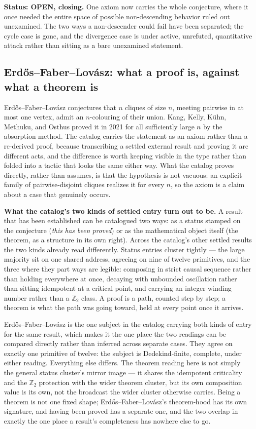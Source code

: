 \documentclass[12pt,a4paper]{article}
\makeatletter
\renewcommand{\_}{\ig@origunderscore\discretionary{}{}{}}
\makeatother
\begin{document}
\textbf{Status: OPEN, closing.} One axiom now carries the whole conjecture, where it
once needed the entire space of possible non-descending behavior ruled out unexamined.
The two ways a non-descender could fail have been separated; the cycle case is gone,
and the divergence case is under active, unrefuted, quantitative attack rather than
sitting as a bare unexamined statement.

\subsection{Erdős–Faber–Lovász: what a proof is, against what a theorem is}
\label{sec:efl}

Erdős–Faber–Lovász conjectures that $n$ cliques of size $n$, meeting pairwise in at
most one vertex, admit an $n$-colouring of their union. Kang, Kelly, Kühn, Methuku, and
Osthus proved it in 2021 for all sufficiently large $n$ by the absorption method. The
catalog carries the statement as an axiom rather than a re-derived proof, because
transcribing a settled external result and proving it are different acts, and the
difference is worth keeping visible in the type rather than folded into a tactic that
looks the same either way. What the catalog proves directly, rather than assumes, is
that the hypothesis is not vacuous: an explicit family of pairwise-disjoint cliques
realizes it for every $n$, so the axiom is a claim about a case that genuinely occurs.

\textbf{What the catalog's two kinds of settled entry turn out to be.} A result that
has been established can be catalogued two ways: as a status stamped on the
conjecture (\emph{this has been proved}) or as the mathematical object itself (the
theorem, as a structure in its own right). Across the catalog's other settled results
the two kinds already read differently. Status entries cluster tightly --- the large
majority sit on one shared address, agreeing on nine of twelve primitives, and the
three where they part ways are legible: composing in strict causal sequence rather
than holding everywhere at once, decaying with unbounded oscillation rather than
sitting idempotent at a critical point, and carrying an integer winding number rather
than a $\mathbb{Z}_2$ class. A proof is a path, counted step by step; a theorem is
what the path was going toward, held at every point once it arrives.

Erdős–Faber–Lovász is the one subject in the catalog carrying both kinds of entry for
the same result, which makes it the one place the two readings can be compared
directly rather than inferred across separate cases. They agree on exactly one
primitive of twelve: the subject is Dedekind-finite, complete, under either reading.
Everything else differs. The theorem reading here is not simply the general status
cluster's mirror image --- it shares the idempotent criticality and the $\mathbb{Z}_2$
protection with the wider theorem cluster, but its own composition value is its own,
not the broadcast the wider cluster otherwise carries. Being a theorem is not one
fixed shape; Erdős–Faber–Lovász's theorem-hood has its own signature, and having
been proved has a separate one, and the two overlap in exactly the one place a
result's completeness has nowhere else to go.
\end{document}
